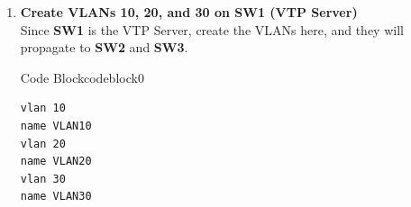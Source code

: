 \documentclass[a4paper]{book}
\begin{document}
\begin{enumerate}
	      - SW1 Configuration (VTP Master/Server):



	      \begin{ocg}{Code Block}{codeblock}{0}
		      \vspace{0.5cm}
		      \begin{lstlisting}
vtp domain network
vtp mode server
vtp version 2
vtp password CCNP
\end{lstlisting}

	      \end{ocg}

	      - SW2 and SW3 Configuration (VTP Clients):



	      \begin{ocg}{Code Block}{codeblock}{0}
		      \vspace{0.5cm}
		      \begin{lstlisting}
vtp domain network
vtp mode client
vtp version 2
vtp password CCNP
\end{lstlisting}

	      \end{ocg}
	\item \textbf{Create VLANs 10, 20, and 30 on SW1 (VTP Server)} \\
	      Since \textbf{SW1} is the VTP Server, create the VLANs here, and they will propagate to \textbf{SW2} and \textbf{SW3}.




	      \begin{ocg}{Code Block}{codeblock}{0}
		      \vspace{0.5cm}
		      \begin{lstlisting}
vlan 10
name VLAN10
vlan 20
name VLAN20
vlan 30
name VLAN30
\end{lstlisting}

	      \end{ocg}



\end{enumerate}
\end{document}
